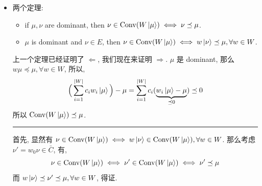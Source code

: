 \begin{itemize}
	\noindent\rule[0.5ex]{\linewidth}{0.5pt} %
	
	\item 两个定理:
	\begin{itemize}
		\item if $\mu, \nu$ are dominant, then $\nu \in \mathrm{Conv}(W \ket{\mu}) \iff \nu \preceq \mu$.
		
		\item $\mu$ is dominant and $\nu \in E$, then $\nu \in \mathrm{Conv}(W \ket{\mu}) \iff w \ket{\nu} \preceq \mu, \forall w \in W$.
	\end{itemize}
	
	\begin{tcolorbox}[title=proof:]
		上一个定理已经证明了 $\Longleftarrow$, 我们现在来证明 $\Longrightarrow$. $\mu$ 是 dominant, 那么 $w \mu \preceq \mu, \forall w \in W$, 所以,
		\begin{equation}
			\Big( \sum_{i = 1}^{|W|} c_i w_i \ket{\mu} \Big) - \mu = \sum_{i = 1}^{|W|} c_i (\underbrace{w_i \ket{\mu} - \mu}_{\preceq 0}) \preceq 0
		\end{equation}
		所以 $\mathrm{Conv}(W \ket{\mu}) \preceq \mu$.
		
		\noindent\rule[0.5ex]{\linewidth}{0.5pt} %
		
		首先, 显然有 $\nu \in \mathrm{Conv}(W \ket{\mu}) \iff w \ket{\nu} \in \mathrm{Conv}(W \ket{\mu}), \forall w \in W$. 那么考虑 $\nu' = w_0 \nu \in \bar{C}$, 有,
		\begin{equation}
			\nu \in \mathrm{Conv}(W \ket{\mu}) \iff \nu' \in \mathrm{Conv}(W \ket{\mu}) \iff \nu' \preceq \mu
		\end{equation}
		而 $w \ket{\nu} \preceq \nu' \preceq \mu, \forall w \in W$, 得证.
	\end{tcolorbox}
\end{itemize}

